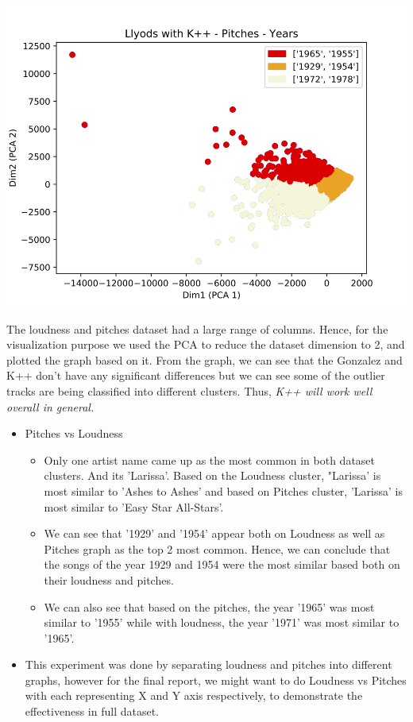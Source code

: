 \documentclass[11pt]{article}
\begin{document}
\begin{center}
\includegraphics[scale=0.3]{assests/fig8.png}
\end{center}

The loudness and pitches dataset had a large range of columns. Hence, for the visualization purpose we used the PCA to reduce the dataset dimension to 2, and plotted the graph based on it. From the graph, we can see that the Gonzalez and K++ don't have any significant differences but we can see some of the outlier tracks are being classified into different clusters. Thus, \textit{K++ will work well overall in general.}

\begin{itemize}
\item Pitches vs Loudness
\begin{itemize}
	\item Only one artist name came up as the most common in both dataset clusters. And its 'Larissa'. Based on the Loudness cluster, "Larissa' is most similar to 'Ashes to Ashes' and based on Pitches cluster, 'Larissa' is most similar to 'Easy Star All-Stars'. 
	\item We can see that '1929' and '1954' appear both on Loudness as well as Pitches graph as the top 2 most common. Hence, we can conclude that the songs of the year 1929 and 1954 were the most similar based both on their loudness and pitches.
	\item We can also see that based on the pitches, the year '1965' was most similar to '1955' while with loudness, the year '1971' was most similar to '1965'. 
\end{itemize}
\item This experiment was done by separating loudness and pitches into different graphs, however for the final report, we might want to do Loudness vs Pitches with each representing X and Y axis respectively, to demonstrate the effectiveness in full dataset.
\end{itemize}
\end{document}
